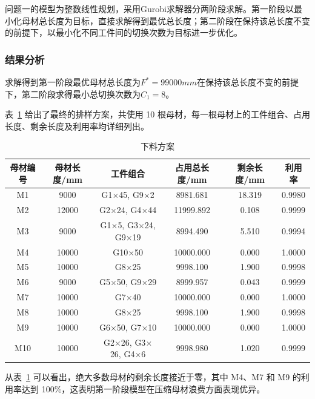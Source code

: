 \documentclass[UTF8]{ctexart}
\begin{document}
问题一的模型为整数线性规划，采用Gurobi求解器分两阶段求解。第一阶段以最小化母材总长度为目标，直接求解得到最优总长度；第二阶段在保持该总长度不变的前提下，以最小化不同工件间的切换次数为目标进一步优化。

\subsubsection{结果分析}

求解得到第一阶段最优母材总长度为$F^*=99000 mm$在保持该总长度不变的前提下，第二阶段求得最小总切换次数为$C_1=8$。

表~\ref{tab:cutting} 给出了最终的排样方案，共使用 10 根母材，每一根母材上的工件组合、占用长度、剩余长度及利用率均详细列出。

\begin{table}[htbp]
\centering
\caption{下料方案}
\label{tab:cutting}
\begin{tabular}{cccccc}
\toprule
母材编号 & 母材长度/mm & 工件组合 & 占用总长度/mm & 剩余长度/mm & 利用率 \\
\midrule
M1  & 9000  & G1$\times$45, G9$\times$2        & 8981.681  & 18.319 & 0.9980 \\
M2  & 12000 & G2$\times$24, G4$\times$44       & 11999.892 & 0.108  & 0.9999 \\
M3  & 9000  & G1$\times$5, G3$\times$24, G9$\times$19 & 8994.490 & 5.510  & 0.9994 \\
M4  & 10000 & G10$\times$50                    & 10000.000 & 0.000  & 1.0000 \\
M5  & 10000 & G8$\times$25                     & 9998.100  & 1.900  & 0.9998 \\
M6  & 9000  & G5$\times$50, G9$\times$29       & 8999.957  & 0.043  & 0.9999 \\
M7  & 10000 & G7$\times$40                     & 10000.000 & 0.000  & 1.0000 \\
M8  & 10000 & G8$\times$25                     & 9998.100  & 1.900  & 0.9998 \\
M9  & 10000 & G6$\times$50, G7$\times$10       & 10000.000 & 0.000  & 1.0000 \\
M10 & 10000 & G2$\times$26, G3$\times$26, G4$\times$6 & 9998.980 & 1.020  & 0.9999 \\
\bottomrule
\end{tabular}
\end{table}

从表~\ref{tab:cutting} 可以看出，绝大多数母材的剩余长度接近于零，其中 M4、M7 和 M9 的利用率达到 100\%，这表明第一阶段模型在压缩母材浪费方面表现优异。
\end{document}
